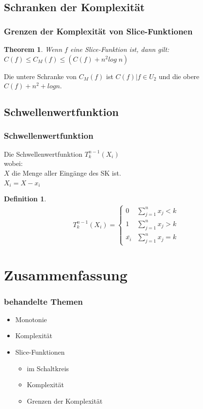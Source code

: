 \documentclass[hyperref={pdfpagelabels=false}]{beamer} %
\newtheorem{thm}{Theorem}
\newtheorem{defin}{Definition}
\begin{document}
  \subsection*{Schranken der Komplexität}
  \begin{frame}%
    \frametitle{Grenzen der Komplexität von Slice-Funktionen}
    \begin{thm}
      Wenn $f$ eine Slice-Funktion ist, dann gilt:
      $C(f) \leq C_M(f) \leq (C(f) +n^2 log\;n)$%
    \end{thm}
    Die untere Schranke von $C_M(f)$ ist $C(f)|f \in U_2$ und die obere $C(f) + n^2 + log n$.
  \end{frame}

  \subsection*{Schwellenwertfunktion}
  \begin{frame}%
     \frametitle{Schwellenwertfunktion}
     Die Schwellenwertfunktion $ T^{n-1}_k(X_i)$\\
     wobei: \\
     $X$ die Menge aller Eingänge des SK ist.\\
     $X_i = X- x_i$
     \begin{defin}
       \begin{align*}
       T^{n-1}_k (X_i)=
       \begin{cases}
         0 & \sum\nolimits_{j=1}^{n} x_j < k\\
         1 & \sum\nolimits_{j=1}^{n} x_j > k\\
         \overline{x_i} & \sum\nolimits_{j=1}^{n} x_j = k
        \end{cases}
       \end{align*}
      \end{defin}
  \end{frame}

  \section{Zusammenfassung}
  \begin{frame}
    \frametitle{behandelte Themen}
    \begin{itemize}
      \item Monotonie
      \item Komplexität
      \item Slice-Funktionen
      \begin{itemize}
        \item im Schaltkreis
        \item Komplexität
        \item Grenzen der Komplexität
      \end{itemize}
    \end{itemize}
  \end{frame}
\end{document}
